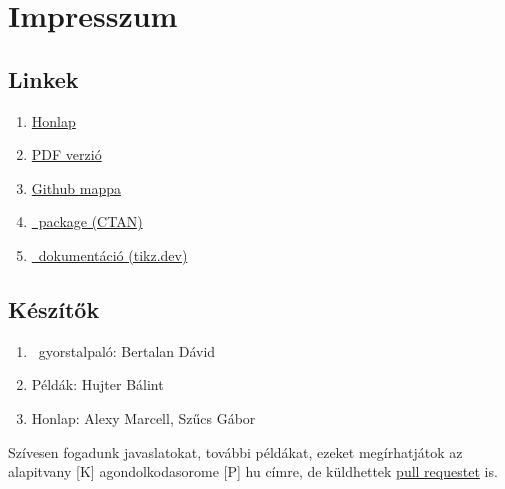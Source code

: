 \chapter{Impresszum}

\section{Linkek}
\begin{enumerate}
    \item[] \href{./index.html}{Honlap}
    \item[] \href{./mainpage.pdf}{PDF verzió}
    \item[] \href{https://github.com/a-gondolkodas-orome/tikz-tutorial}{Github mappa} 
    \item[] \href{https://ctan.ijs.si/tex-archive/graphics/pgf/base/doc/pgfmanual.pdf}{\tikzname\ package (CTAN)} 
    \item[] \href{https://tikz.dev/}{\tikzname\ dokumentáció (tikz.dev)} 
\end{enumerate}
        
\section{Készítők}
\begin{enumerate}
    \item[] \tikzname\ gyorstalpaló: Bertalan Dávid
    \item[] Példák: Hujter Bálint
    \item[] Honlap: Alexy Marcell, Szűcs Gábor
\end{enumerate}

Szívesen fogadunk javaslatokat, további példákat, ezeket megírhatjátok az alapitvany [K] agondolkodasorome [P] hu címre, de küldhettek \href{https://github.com/a-gondolkodas-orome/tikz-tutorial/pulls}{pull requestet} is. 
